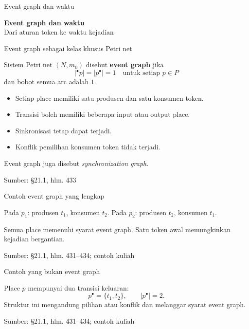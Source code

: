 \documentclass[aspectratio=169,11pt]{beamer}
\newcommand{\source}[1]{%
    \vfill
    \hfill{\tiny\color{gray}Sumber: #1}
}
\newcommand{\tok}[1]{\fill[AcademicBlue] (#1.center) circle (2.2pt);}
\begin{document}
\begin{frame}{Event graph dan waktu}
\begin{center}{\LARGE\bfseries\color{AcademicBlue}Event graph dan waktu}\\[8mm]Dari aturan token ke waktu kejadian\end{center}
\end{frame}
\begin{frame}{Event graph sebagai kelas khusus Petri net}

Sistem Petri net $(N,m_0)$ disebut \textbf{event graph} jika
\[
|{}^\bullet p|=|p^\bullet|=1\quad\text{untuk setiap }p\in P
\]
dan bobot semua arc adalah $1$.
\begin{itemize}
\item Setiap place memiliki satu produsen dan satu konsumen token.
\item Transisi boleh memiliki beberapa input atau output place.
\item Sinkronisasi tetap dapat terjadi.
\item Konflik pemilihan konsumen token tidak terjadi.
\end{itemize}
Event graph juga disebut \textit{synchronization graph}.

\source{\S21.1, hlm. 433}
\end{frame}
\begin{frame}{Contoh event graph yang lengkap}

\begin{center}\end{center}
Pada $p_1$: produsen $t_1$, konsumen $t_2$.
Pada $p_2$: produsen $t_2$, konsumen $t_1$.
\medskip

Semua place memenuhi syarat event graph.
Satu token awal memungkinkan kejadian bergantian.

\source{\S21.1, hlm. 431--434; contoh kuliah}
\end{frame}
\begin{frame}{Contoh yang bukan event graph}

\begin{center}\end{center}
Place $p$ mempunyai dua transisi keluaran:
\[
p^\bullet=\{t_1,t_2\},\qquad |p^\bullet|=2.
\]
Struktur ini mengandung pilihan atau konflik dan melanggar syarat event graph.

\source{\S21.1, hlm. 431--434; contoh kuliah}
\end{frame}
\end{document}
